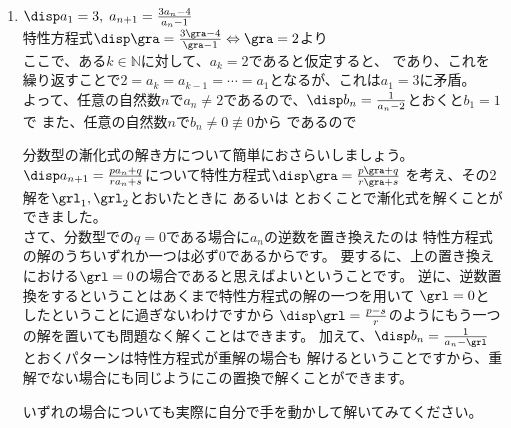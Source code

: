 \documentclass[a4paper]{ltjsarticle}
\begin{document}
\begin{question*}
\begin{ans*}
\begin{enumerate}[label=\arabic*.]
  \item $\disp a_1 = 3,\; a_{n+1} = \frac{3a_n-4}{a_n-1}$ \bunsujuukai \\
  特性方程式$\disp \gra =\frac{3\gra - 4}{\gra - 1} \Leftrightarrow \gra = 2$より \\
  ここで、ある$k\in \mathbb{N}$に対して、$a_k = 2$であると仮定すると、
  であり、これを繰り返すことで$2 = a_k = a_{k-1} = \cdots = a_1$となるが、これは$a_1 = 3$に矛盾。\\
  よって、任意の自然数$n$で$a_n \neq 2$であるので、$\disp b_n = \frac{1}{a_n - 2}$とおくと$b_1 = 1$で
  また、任意の自然数$n$で$b_n \neq 0 \not\equiv 0$から
  であるので

  \begin{supple*}
    分数型の漸化式の解き方について簡単におさらいしましょう。\\
    $\disp a_{n+1} = \frac{pa_n + q}{ra_n + s}$について特性方程式$\disp\gra = \frac{p\gra + q}{r\gra + s}$
    を考え、その2解を$\grl_1,\grl_2$とおいたときに
    あるいは
    とおくことで漸化式を解くことができました。 \\
    さて、分数型での$q=0$である場合に$a_n$の逆数を置き換えたのは
    特性方程式の解のうちいずれか一つは必ず$0$であるからです。
    要するに、上の置き換えにおける$\grl = 0$の場合であると思えばよいということです。
    逆に、逆数置換をするということはあくまで特性方程式の解の一つを用いて
    $\grl = 0$としたということに過ぎないわけですから
    $\disp\grl = \frac{p-s}{r}$のようにもう一つの解を置いても問題なく解くことはできます。
    加えて、$\disp b_n = \frac{1}{a_n - \grl}$とおくパターンは特性方程式が重解の場合も
    解けるということですから、重解でない場合にも同じようにこの置換で解くことができます。

    いずれの場合についても実際に自分で手を動かして解いてみてください。
  \end{supple*}


\end{enumerate}
\end{ans*}
\end{question*}
\end{document}
